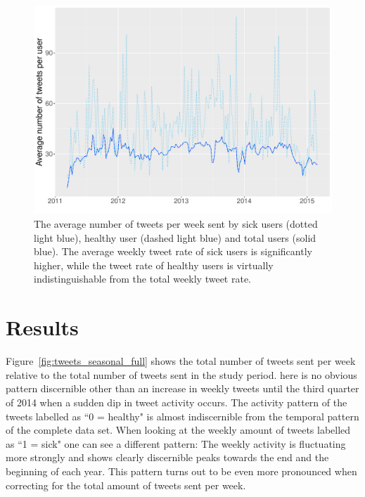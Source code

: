 \documentclass[11pt, a4paper,twoside]{report}\usepackage[]{graphicx}\usepackage[]{color}
\begin{document}
\begin{figure}[H]
\centering
\includegraphics[width=1\linewidth]{avg_tw_sick_healthy.pdf}
\caption{The average number of tweets per week sent by sick users (dotted light blue), healthy user (dashed light blue) and total users (solid blue). The average weekly tweet rate of sick users is significantly higher, while the tweet rate of healthy users is virtually indistinguishable from the total weekly tweet rate.}
\label{fig:avg_tw_diff}
\end{figure}

\thispagestyle{empty}
\cleardoublepage

\chapter{Results}
\label{ch:results}
Figure~\ref{fig:tweets_seasonal_full} shows the total number of tweets sent per week relative to the total number of tweets sent in the study period. here is no obvious pattern discernible other than an increase in weekly tweets until the third quarter of 2014 when a sudden dip in tweet activity occurs. The activity pattern of the tweets labelled as ``0 = healthy" is almost indiscernible from the temporal pattern of the complete data set. When looking at the weekly amount of tweets labelled as ``1 = sick" one can see a different pattern: The weekly activity is fluctuating more strongly and shows clearly discernible peaks towards the end and the beginning of each year. This pattern turns out to be even more pronounced when correcting for the total amount of tweets sent per week.\newline
\end{document}
